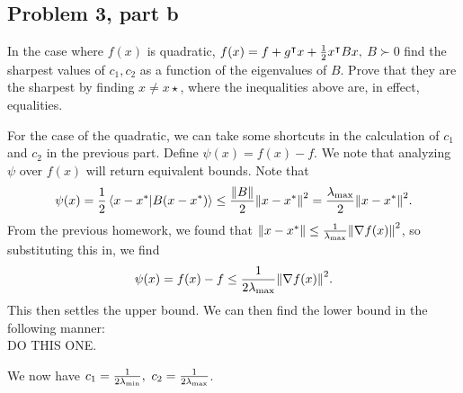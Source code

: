 \subsection{Problem 3, part b}
In the case where $f(x)$ is quadratic,
$f(x) = f + g^\intercal x + \frac{1}{2}x^\intercal Bx,$ $ B\succ 0$ find the sharpest values of $c_1, c_2$ as a function of the eigenvalues of $B$. Prove that they are the sharpest by finding $x \neq x\star$, where the inequalities above are, in effect, equalities.
\partbreak
\begin{solution}

    For the case of the quadratic, we can take some shortcuts in the calculation of $c_1$ and $c_2$ in the previous part. Define $\psi(x) = f(x) - f$. We note that analyzing $\psi$ over $f(x)$ will return equivalent bounds. Note that 
    \[\psi(x) = \frac{1}{2}\braket{x - x^{*}}{B(x - x^{*})} \leq \frac{\norm{B}}{2}\norm{x - x^{*}}^2 = \frac{\mathrm{\lambda}_{\max}}{2}\norm{x - x^{*}}^2.\]
    From the previous homework, we found that $\norm{x - x^{*}} \leq \frac{1}{\mathrm{\lambda}_{\max}}\norm{\nabla f(x)}^2$, so substituting this in, we find 
    \[\psi(x) = f(x) - f \leq \frac{1}{2\mathrm{\lambda}_{\max}}\norm{\nabla f(x)}^2.\]
    This then settles the upper bound. We can then find the lower bound in the following manner:\\

    \quad 
    DO THIS ONE.
    \quad

    We now have $c_1 = \frac{1}{2\lm_{\min}},\ c_2 = \frac{1}{2\lm_{\max}}$.
\end{solution}
